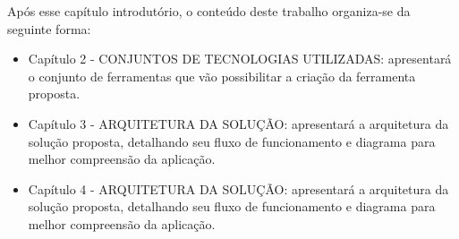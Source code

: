Após esse capítulo introdutório, o conteúdo deste trabalho organiza-se da seguinte forma:
	\begin{itemize}
		\item{Capítulo 2 - \uppercase{Conjuntos de tecnologias utilizadas}: apresentará o conjunto de ferramentas que vão possibilitar a criação da ferramenta proposta.}
		\item{Capítulo 3 - \uppercase{Arquitetura da solução}: apresentará a arquitetura da solução proposta, detalhando seu fluxo de funcionamento e diagrama para melhor compreensão da aplicação.}
		\item{Capítulo 4 - \uppercase{Arquitetura da solução}: apresentará a arquitetura da solução proposta, detalhando seu fluxo de funcionamento e diagrama para melhor compreensão da aplicação.}
	\end{itemize}
